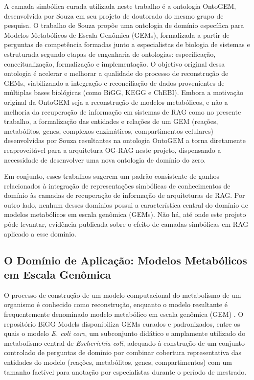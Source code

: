 \documentclass{article}
\begin{document}
	A camada simbólica curada utilizada neste trabalho é a ontologia OntoGEM, desenvolvida por Souza \cite{souza2025ontogem} em seu projeto de doutorado do mesmo grupo de pesquisa. O trabalho de Souza propõe uma ontologia de domínio específica para Modelos Metabólicos de Escala Genômica (GEMs), formalizada a partir de perguntas de competência formadas junto a especialistas de biologia de sistemas e estruturada segundo etapas de engenharia de ontologias: especificação, conceitualização, formalização e implementação. O objetivo original dessa ontologia é acelerar e melhorar a qualidade do processo de reconstrução de GEMs, viabilizando a integração e reconciliação de dados provenientes de múltiplas bases biológicas (como BiGG, KEGG e ChEBI). Embora a motivação original da OntoGEM seja a reconstrução de modelos metabólicos, e não a melhoria da recuperação de informação em sistemas de RAG como no presente trabalho, a formalização das entidades e relações de um GEM (reações, metabólitos, genes, complexos enzimáticos, compartimentos celulares) desenvolvidas por Souza \cite{souza2025ontogem} resultantes na ontologia OntoGEM a torna diretamente reaproveitável para a arquitetura OG-RAG neste projeto, dispensando a necessidade de desenvolver uma nova ontologia de domínio do zero.
	
	Em conjunto, esses trabalhos sugerem um padrão consistente de ganhos relacionados à integração de representações simbólicas de conhecimentos de domínio às camadas de recuperação de informação de arquiteturas de RAG. Por outro lado, nenhum desses domínios possui a característica central do domínio de modelos metabólicos em escala genômica (GEMs). Não há, até onde este projeto pôde levantar, evidência publicada sobre o efeito de camadas simbólicas em RAG aplicado a esse domínio.
	
	
	\subsection{O Domínio de Aplicação: Modelos Metabólicos em Escala Genômica}
	
	
	O processo de construção de um modelo computacional do metabolismo de um organismo é conhecido como reconstrução, enquanto o modelo resultante é frequentemente denominado modelo metabólico em escala genômica (GEM) \cite{souza2025ontogem}. O repositório BiGG Models \cite{king2016bigg} disponibiliza GEMs curados e padronizados, entre os quais o modelo \textit{E. coli core}, um subconjunto didático e amplamente utilizado do metabolismo central de \textit{Escherichia coli}, adequado à construção de um conjunto controlado de perguntas de domínio por combinar cobertura representativa das entidades do modelo (reações, metabólitos, genes, compartimentos) com um tamanho factível para anotação por especialistas durante o período de mestrado.
	
\end{document}
